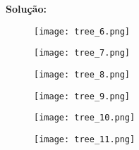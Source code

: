 \textbf{Solução:}

\begin{figure}[H]
    \centering
    \texttt{[image: tree\_6.png]}
\end{figure}

\begin{figure}[H]
    \centering
    \texttt{[image: tree\_7.png]}
\end{figure}

\begin{figure}[H]
    \centering
    \texttt{[image: tree\_8.png]}
\end{figure}

\begin{figure}[H]
    \centering
    \texttt{[image: tree\_9.png]}
\end{figure}

\begin{figure}[H]
    \centering
    \texttt{[image: tree\_10.png]}
\end{figure}

\begin{figure}[H]
    \centering
    \texttt{[image: tree\_11.png]}
\end{figure}
